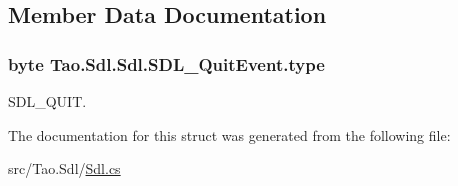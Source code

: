 \subsection{Member Data Documentation}
\hypertarget{struct_tao_1_1_sdl_1_1_sdl_1_1_s_d_l___quit_event_a000e04d4783f821917569ef4942128fa}{
\subsubsection[{type}]{\setlength{\rightskip}{0pt plus 5cm}byte {\bf Tao.Sdl.Sdl.SDL\_\-QuitEvent.type}}}
\label{struct_tao_1_1_sdl_1_1_sdl_1_1_s_d_l___quit_event_a000e04d4783f821917569ef4942128fa}


SDL\_\-QUIT. 



The documentation for this struct was generated from the following file:\begin{DoxyCompactItemize}
\item 
src/Tao.Sdl/\hyperlink{_sdl_8cs}{Sdl.cs}\end{DoxyCompactItemize}
